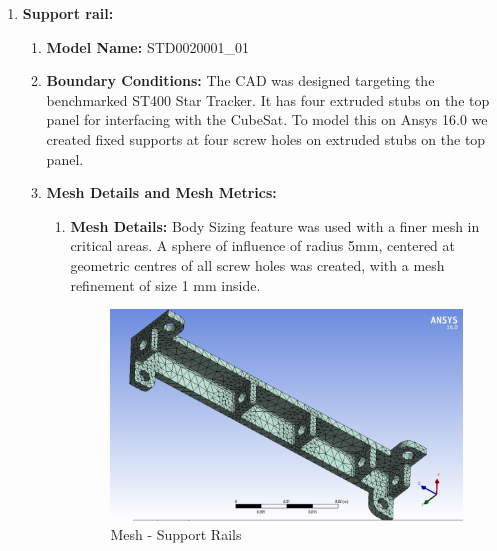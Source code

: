 \documentclass[../../main.tex]{subfiles}
\begin{document}
\begin{enumerate}
        \newpage
        \item \textbf{Support rail:}
        \begin{enumerate}
            \item \textbf{Model Name: }STD0020001\_01
            \item \textbf{Boundary Conditions: }The CAD was designed targeting the benchmarked ST400 Star Tracker. It has four extruded stubs on the top panel for interfacing with the CubeSat. To model this on Ansys 16.0 we created fixed supports at four screw holes on extruded stubs on the top panel.
            \item \textbf{Mesh Details and Mesh Metrics:}
            \begin{enumerate}
                \item \textbf{Mesh Details:} Body Sizing feature was used with a finer mesh in critical areas. A sphere of influence of radius 5mm, centered at geometric centres of all screw holes was created, with a mesh refinement of size 1 mm inside.\newline
                \newline
                \newline
                \begin{figure}[H]
                    \centering
                    \includegraphics[scale=0.45]{Figures/Mechanical/Support Rail Mesh.PNG}
                    \caption{Mesh - Support Rails}
                    \label{fig:sys_CAD}
                \end{figure}
                \begin{figure}[H]
                    \centering

\end{figure}
\end{enumerate}
\end{enumerate}
\end{enumerate}
\end{document}

